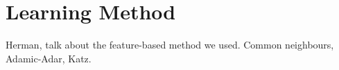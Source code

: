 \section{Learning Method}
Herman, talk about the feature-based method we used. Common neighbours, Adamic-Adar, Katz.
%

